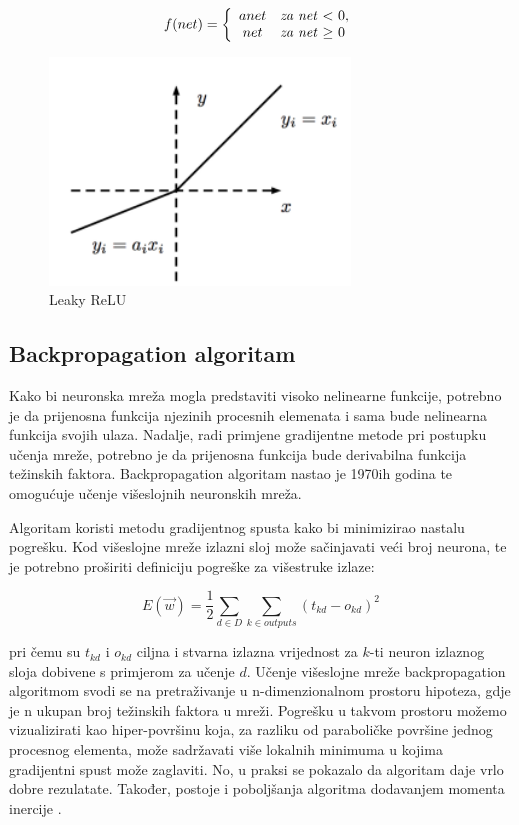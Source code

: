\begin{equation}
f(net)=\left\{
\begin{array}{c l}	
     a {net}   & $\textit{za net} $ < $ $ 0,\\
     {net}     & $\textit{za net} $ \geq $ $ 0
\end{array}\right.
\label{eq:Leaky ReLU}
\end{equation}

\begin{figure}[H]
\centering
\includegraphics[width=8cm]{img/LeakyReLU.png}
\caption{Leaky ReLU}
\label{img:Leaky ReLU}
\end{figure}

\subsection{Backpropagation algoritam}

Kako bi neuronska mreža mogla predstaviti visoko nelinearne
funkcije, potrebno je da prijenosna funkcija njezinih procesnih elemenata i sama bude
nelinearna funkcija svojih ulaza. Nadalje, radi primjene gradijentne metode pri postupku
učenja mreže, potrebno je da prijenosna funkcija bude derivabilna funkcija težinskih
faktora. Backpropagation algoritam \citep{Backpropagation} nastao je 1970ih godina te omogućuje učenje višeslojnih neuronskih mreža.

Algoritam koristi metodu gradijentnog spusta kako bi minimizirao nastalu pogrešku.
Kod višeslojne mreže izlazni sloj može sačinjavati veći broj neurona, te je potrebno
proširiti definiciju pogreške za višestruke izlaze:

\begin{equation}
E(\vec{w}) = \frac{1}{2} \sum_{d \in D}^{} \sum_{k \in outputs}^{} (t_{kd} - o_{kd})^2
\label{eq:loss-function}
\end{equation}

pri čemu su $t_{kd}$ i $o_{kd}$ ciljna i stvarna izlazna vrijednost za $k$-ti neuron izlaznog sloja dobivene s primjerom za učenje $d$. Učenje višeslojne mreže backpropagation algoritmom svodi se na pretraživanje u n-dimenzionalnom prostoru hipoteza, gdje je n ukupan broj težinskih faktora u mreži. Pogrešku u takvom prostoru možemo vizualizirati kao hiper-površinu koja, za razliku od paraboličke površine jednog procesnog elementa, može sadržavati više lokalnih minimuma u kojima gradijentni spust može zaglaviti. No, u praksi se pokazalo da algoritam daje vrlo dobre rezulatate. Također, postoje i poboljšanja algoritma dodavanjem momenta inercije \citep{NesterovMomentum}.\\

